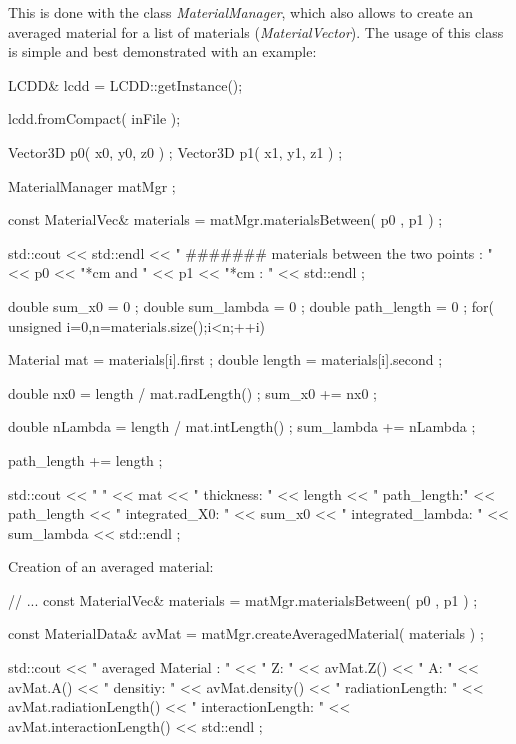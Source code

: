 \documentclass[10pt,a4paper]{article}
\begin{document}
\noindent
This is done with the class {\em MaterialManager}, which also allows to
create an averaged material for a list of materials ({\em MaterialVector}).
The usage of this class is simple and best demonstrated with an example:

\begin{code}

  LCDD& lcdd = LCDD::getInstance();

  lcdd.fromCompact( inFile );

  Vector3D p0( x0, y0, z0 ) ;
  Vector3D p1( x1, y1, z1 ) ;

  MaterialManager matMgr ;

  const MaterialVec& materials = matMgr.materialsBetween( p0 , p1  ) ;
	
  std::cout  << std::endl  
             << " #######  materials between the two  points : " 
             << p0 << "*cm  and " << p1 << "*cm :  "  
             << std::endl ;

  double sum_x0 = 0 ;
  double sum_lambda = 0 ;
  double path_length = 0 ;
  for( unsigned i=0,n=materials.size();i<n;++i){

    Material mat =  materials[i].first  ;
    double length = materials[i].second  ;

    double nx0 = length / mat.radLength()  ;
    sum_x0 += nx0 ;

    double nLambda = length / mat.intLength()  ;
    sum_lambda += nLambda ;

    path_length += length ;

    std::cout << "      "               << mat 
              << " thickness: "         << length 
              << " path_length:"        << path_length
              << " integrated_X0: "     << sum_x0 
              << " integrated_lambda: " << sum_lambda 
              <<  std::endl ;
  }

\end{code}

\noindent
Creation of an averaged material:

\begin{code}
  // ...
  const MaterialVec& materials = matMgr.materialsBetween( p0 , p1  ) ;
	
  const MaterialData& avMat = matMgr.createAveragedMaterial( materials ) ;

  std::cout << " averaged Material : " << " Z: " << avMat.Z() << " A: " << avMat.A() 
            << " densitiy: "           << avMat.density()
            << " radiationLength: "    << avMat.radiationLength() 
            << " interactionLength: "  << avMat.interactionLength()  
            << std::endl ;
\end{code}
\end{document}

